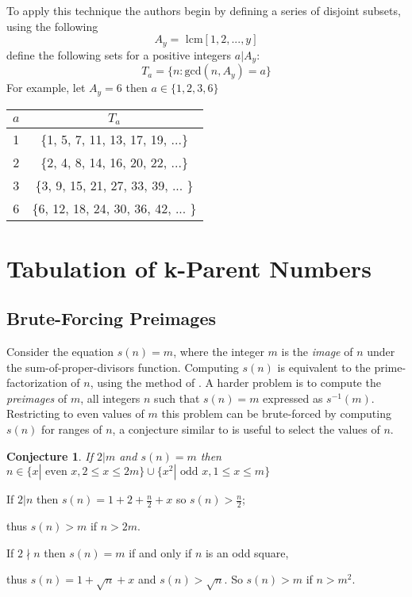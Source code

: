 \documentclass{article}
\theoremstyle{definition}
\newtheorem{conjecture}{Conjecture}[section]
\begin{document}
To apply this technique the authors begin by defining a series of disjoint subsets, using the following
$$A_y = \text{ lcm}[1, 2, ..., y]$$
define the following sets for a positive integers $a | A_y$:
$$T_a = \{n : \text{gcd}(n, A_y) = a\}$$
For example, let $A_y = 6$ then $a \in \{1,2,3,6\}$

\begin{center}
\begin{tabular}{ |c|c|} 
 \hline
 $a$ & $T_a$\\ 
 \hline
 1 & \{1, 5, 7, 11, 13, 17, 19, ...\}\\ 
 \hline
 2 & \{2, 4, 8, 14, 16, 20, 22, ...\}\\ 
 \hline
 3 & \{3, 9, 15, 21, 27, 33, 39, ...  \}\\ 
 \hline
 6 & \{6, 12, 18, 24, 30, 36, 42, ... \}\\ 
 \hline

\end{tabular}
\end{center}


\section{Tabulation of k-Parent Numbers}
\subsection{Brute-Forcing Preimages}
Consider the equation $s(n) = m$, where the integer $m$ is the \textit{image} of $n$ under the sum-of-proper-divisors function. Computing $s(n)$ is equivalent to the prime-factorization of $n$, using the method of \cite{compute_sumdiv}. A harder problem is to compute the \textit{preimages} of $m$, all integers $n$ such that $s(n) = m$ expressed as $s^{-1}(m)$. Restricting to even values of $m$ this problem can be brute-forced by computing $s(n)$ for ranges of $n$, a conjecture similar to \cite{sumdiv_range} is useful to select the values of $n$.

\begin{conjecture} \textit{If $2 | m$ and $s(n) = m$ then $n \in \{x| \text{ even } x, 2 \leq x \leq 2m \} \cup \{x^2| \text{ odd } x, 1 \leq x \leq m\}$}

    If $2 | n$ then $s(n) = 1+ 2 + \frac{n}{2} + x $ so $s(n) > \frac{n}{2}$;

    \hspace{\parindent}thus $s(n) > m$ if $n > 2m$.

    If $2 \nmid n$ then $s(n) = m$ if and only if $n$ is an odd square,

    \hspace{\parindent}thus $s(n) = 1 + \sqrt{n} + x$ and $s(n) > \sqrt{n}$. So $s(n) > m$ if $n > m^2$.
\end{conjecture}
\end{document}
